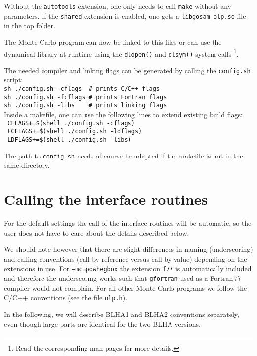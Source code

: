 Without the \texttt{autotools} extension, one only needs to call {\tt make} without
any parameters. If the \texttt{shared} extension is enabled, one gets a \texttt{libgosam\_olp.so} file
in the top folder.

The Monte-Carlo program can now be linked to this files or can
use the dynamical library at runtime using the \texttt{dlopen()} and \texttt{dlsym()} system calls%
\footnote{Read the corresponding man pages for more details.}.

The needed compiler and linking flags can be generated by calling the \texttt{config.sh} script:\\
\texttt{sh ./config.sh -cflags\ \  \# prints C/C++ flags}\\
\texttt{sh ./config.sh -fcflags \# prints Fortran flags}\\
\texttt{sh ./config.sh -libs \ \ \  \# prints linking flags}\\

Inside a makefile, one can use the following lines to extend existing build flags:\\
\texttt{ CFLAGS+=\$(shell ./config.sh -cflags)}\\
\texttt{ FCFLAGS+=\$(shell ./config.sh -ldflags)} \\
\texttt{ LDFLAGS+=\$(shell ./config.sh -libs)}

The path to \texttt{config.sh} needs of course be adapted if the makefile is not in the
same directory.

\section{Calling the interface routines}

For the default settings the call of the interface routines 
will be automatic, so the user does not have to care about the details described below.

We should note however that there are slight differences in naming (underscoring) and calling
conventions (call by reference versus call by value) depending on the
extensions in use. For \texttt{--mc=powhegbox} the extension \texttt{f77}
is automatically included and therefore the underscoring works such that
\texttt{gfortran} used as a Fortran\,77 compiler would not complain.
For all other Monte Carlo programs we follow the C/C++ conventions
(see the file \texttt{olp.h}).

In the following, we will describe BLHA1 and BLHA2 conventions separately, 
even though large parts are identical for the two BLHA versions.

